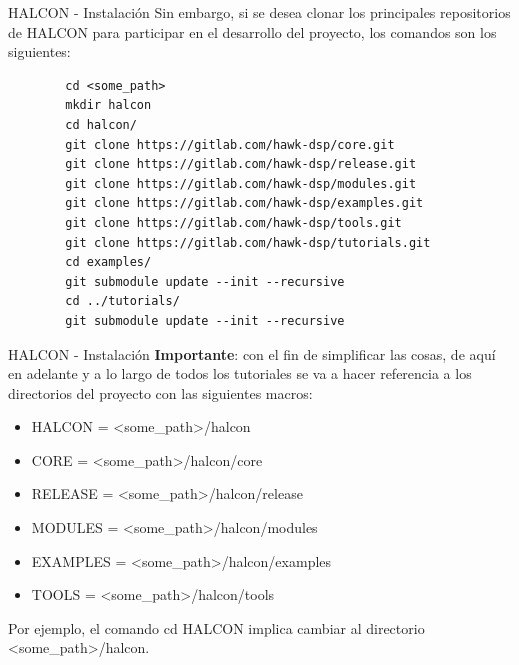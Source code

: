 \documentclass[11pt]{beamer}
\begin{document}
	\begin{frame}[fragile]{HALCON - Instalación}
		Sin embargo, si se desea clonar los principales repositorios de HALCON para participar en el desarrollo del proyecto, los comandos son los siguientes:\newline
		
		\begin{lstlisting}
		cd <some_path>
		mkdir halcon
		cd halcon/
		git clone https://gitlab.com/hawk-dsp/core.git
		git clone https://gitlab.com/hawk-dsp/release.git
		git clone https://gitlab.com/hawk-dsp/modules.git
		git clone https://gitlab.com/hawk-dsp/examples.git
		git clone https://gitlab.com/hawk-dsp/tools.git
		git clone https://gitlab.com/hawk-dsp/tutorials.git
		cd examples/
		git submodule update --init --recursive
		cd ../tutorials/
		git submodule update --init --recursive
		\end{lstlisting}
		
	\end{frame}
	
	\begin{frame}{HALCON - Instalación}
	\textbf{Importante}: con el fin de simplificar las cosas, de aquí en adelante y a lo largo de todos los tutoriales se va a hacer referencia a los directorios del proyecto con las siguientes macros:\newline
	
	\begin{itemize}
		\item {HALCON} = <some\_path>/halcon
		\item {CORE} = <some\_path>/halcon/core
		\item {RELEASE} = <some\_path>/halcon/release
		\item {MODULES} = <some\_path>/halcon/modules
		\item {EXAMPLES} = <some\_path>/halcon/examples
		\item {TOOLS} = <some\_path>/halcon/tools
	\end{itemize}
	
	\vspace{0.5cm}
	Por ejemplo, el comando cd {HALCON} implica cambiar al directorio <some\_path>/halcon.
	\end{frame}
	
\end{document}
